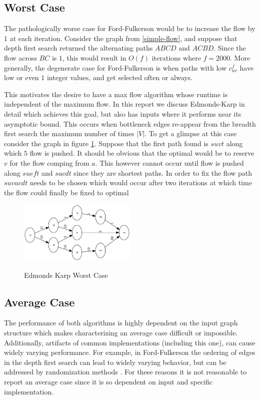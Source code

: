 \documentclass{article}
\begin{document}
\subsection{Worst Case}
The pathologically worse case for Ford-Fulkerson would be to increase the flow by $1$ at each iteration. Consider the graph from \ref{simple-flow}, and suppose that depth first search returned the alternating paths $ABCD$ and $ACBD$. Since the flow across $BC$ is $1$, this would result in $O(f)$ iterations where $f=2000$. More generally, the degenerate case for Ford-Fulkerson is when paths with low $c_{uv}^f$ have low or even $1$ integer values, and get selected often or always.

This motivates the desire to have a max flow algorithm whose runtime is independent of the maximum flow. In this report we discuss Edmonds-Karp in detail which achieves this goal, but also has inputs where it performs near its asymptotic bound. This occurs when bottleneck edges re-appear from the breadth first search the maximum number of times $|V|$. To get a glimpse at this case consider the graph in figure \ref{ek-flow}. Suppose that the first path found is $suvt$ along which $5$ flow is pushed. It should be obvious that the optimal would be to reserve $v$ for the flow comping from $a$. This however cannot occur until flow is pushed along $sueft$ and $sacdt$ since they are shortest paths. In order to fix the flow path $suvacdt$ needs to be chosen which would occur after two iterations at which time the flow could finally be fixed to optimal

\begin{figure}[!ht]
	\caption{Edmonds Karp Worst Case}
	\centering
	\includegraphics[width=0.5\textwidth]{images/edmonds-karp.png}
	\label{ek-flow}
\end{figure}

\subsection{Average Case}
The performance of both algorithms is highly dependent on the input graph structure which makes characterizing an average case difficult or impossible. Additionally, artifacts of common implementations (including this one), can cause widely varying performance. For example, in Ford-Fulkerson the ordering of edges in the depth first search can lead to widely varying behavior, but can be addressed by randomization methods \cite{graph-paths}. For these reasons it is not reasonable to report an average case since it is so dependent on input and specific implementation.
\end{document}
